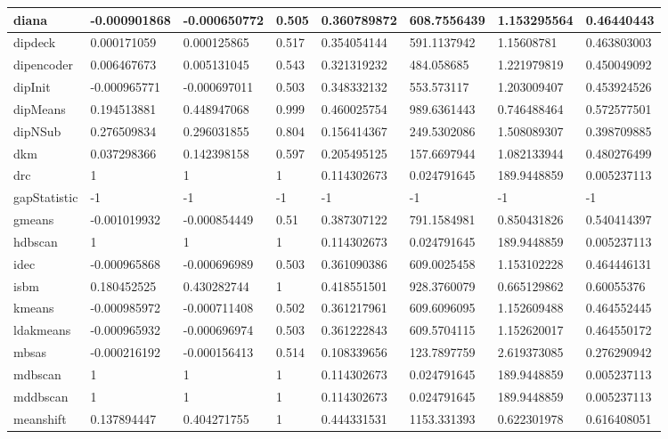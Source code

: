 \begin{table}[H]
\begin{tabular}{|l|l|l|l|l|l|l|l|}
\hline
diana & -0.000901868 & -0.000650772 & 0.505 & 0.360789872 & 608.7556439 & 1.153295564 & 0.46440443 \\
\hline
dipdeck & 0.000171059 & 0.000125865 & 0.517 & 0.354054144 & 591.1137942 & 1.15608781 & 0.463803003 \\
\hline
dipencoder & 0.006467673 & 0.005131045 & 0.543 & 0.321319232 & 484.058685 & 1.221979819 & 0.450049092 \\
\hline
dipInit & -0.000965771 & -0.000697011 & 0.503 & 0.348332132 & 553.573117 & 1.203009407 & 0.453924526 \\
\hline
dipMeans & 0.194513881 & 0.448947068 & 0.999 & 0.460025754 & 989.6361443 & 0.746488464 & 0.572577501 \\
\hline
dipNSub & 0.276509834 & 0.296031855 & 0.804 & 0.156414367 & 249.5302086 & 1.508089307 & 0.398709885 \\
\hline
dkm & 0.037298366 & 0.142398158 & 0.597 & 0.205495125 & 157.6697944 & 1.082133944 & 0.480276499 \\
\hline
drc & 1 & 1 & 1 & 0.114302673 & 0.024791645 & 189.9448859 & 0.005237113 \\
\hline
gapStatistic & -1 & -1 & -1 & -1 & -1 & -1 & -1 \\
\hline
gmeans & -0.001019932 & -0.000854449 & 0.51 & 0.387307122 & 791.1584981 & 0.850431826 & 0.540414397 \\
\hline
hdbscan & 1 & 1 & 1 & 0.114302673 & 0.024791645 & 189.9448859 & 0.005237113 \\
\hline
idec & -0.000965868 & -0.000696989 & 0.503 & 0.361090386 & 609.0025458 & 1.153102228 & 0.464446131 \\
\hline
isbm & 0.180452525 & 0.430282744 & 1 & 0.418551501 & 928.3760079 & 0.665129862 & 0.60055376 \\
\hline
kmeans & -0.000985972 & -0.000711408 & 0.502 & 0.361217961 & 609.6096095 & 1.152609488 & 0.464552445 \\
\hline
ldakmeans & -0.000965932 & -0.000696974 & 0.503 & 0.361222843 & 609.5704115 & 1.152620017 & 0.464550172 \\
\hline
mbsas & -0.000216192 & -0.000156413 & 0.514 & 0.108339656 & 123.7897759 & 2.619373085 & 0.276290942 \\
\hline
mdbscan & 1 & 1 & 1 & 0.114302673 & 0.024791645 & 189.9448859 & 0.005237113 \\
\hline
mddbscan & 1 & 1 & 1 & 0.114302673 & 0.024791645 & 189.9448859 & 0.005237113 \\
\hline
meanshift & 0.137894447 & 0.404271755 & 1 & 0.444331531 & 1153.331393 & 0.622301978 & 0.616408051 \\

\end{tabular}
\end{table}
